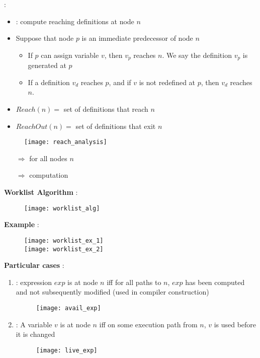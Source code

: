  :

\begin{itemize}
    \item {} : compute reaching definitions at node $n$
    \item Suppose that node $p$ is an immediate predecessor of node $n$
    \begin{itemize}
    \item If $p$ can assign variable $v$, then $v_p$ reaches $n$. We say the definition $v_p$ is generated at $p$
    \item If a definition $v_d$ reaches $p$, and if $v$ is not redefined at $p$, then $v_d$ reaches $n$.
    \end{itemize}
    \item $Reach(n) =$ set of definitions that reach $n$
    \item $ReachOut(n) =$ set of definitions that exit $n$
\end{itemize}
\begin{figure}[H]
    \centering
    \texttt{[image: reach\_analysis]}
\end{figure}
\begin{itemize}
    \item[$\Rightarrow$]  for all nodes $n$
    \item[$\Rightarrow$]  computation
\end{itemize}

\textbf{Worklist Algorithm} :
\begin{figure}[H]
    \centering
    \texttt{[image: worklist\_alg]}
\end{figure}

\textbf{Example} :
\begin{figure}[H]
    \centering
    \texttt{[image: worklist\_ex\_1]}\\
    \texttt{[image: worklist\_ex\_2]}
\end{figure}

\textbf{Particular cases} :
\begin{enumerate}
    \item {} : expression $exp$ is  at node $n$ iff for all paths to $n$, $exp$ has been computed and not subsequently modified (used in compiler construction)
    \begin{figure}[H]
        \centering
        \texttt{[image: avail\_exp]}
    \end{figure}
    \item {} : A variable $v$ is  at node $n$ iff on some execution path from $n$, $v$ is used before it is changed
    \begin{figure}[H]
        \centering
        \texttt{[image: live\_exp]}
    \end{figure}
\end{enumerate}

